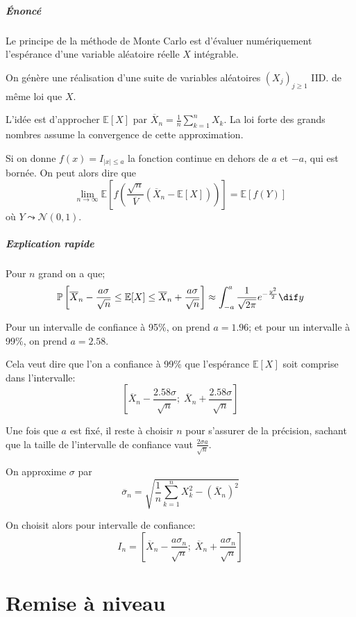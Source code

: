 \documentclass[a4paper,10pt,french,openany]{memoir}
\newcommand{\Proba}{\mathbb{P}}
\newcommand{\Esper}{\mathbb{E}}
\newcommand{\normale}{\mathcal{N}}
\newcommand{\abs}[1]{\lvert #1 \rvert}
\begin{document}
\paragraph{Énoncé}
Le principe de la méthode de Monte Carlo est d'évaluer numériquement l'espérance d'une variable aléatoire réelle $X$ intégrable.

On génère une réalisation d'une suite de variables aléatoires $(X_j)_{j\geq1}$ IID. de même loi que $X$.

L'idée est d'approcher $\Esper[X]$ par $\overline X_n = \frac1n \sum_{k=1}^n X_k$. La loi forte des grands nombres assume la convergence de cette approximation.

Si on donne $f(x)=I_{\abs x \leq a}$ la fonction continue en dehors de $a$ et $-a$, qui est bornée. On peut alors dire que \[\lim_{n\to\infty} \Esper\left[f\left(\frac{\sqrt n}{\overline V} (\overline X_n - \Esper[X])\right)\right] = \Esper[f(Y)]\]
où $Y\leadsto\normale(0,1)$.

\paragraph{Explication rapide}
Pour $n$ grand on a que; \[\Proba\left[\overline X_n - \frac{a\sigma}{\sqrt n} \leq \Esper[X] \leq \overline X_n + \frac{a\sigma}{\sqrt n}\right] \approx \int_{-a}^a \frac1{\sqrt{2\pi}} e^{-\frac{y^2}2} \dif y\]

Pour un intervalle de confiance à 95\%, on prend $a=1.96$; et pour un intervalle à 99\%, on prend $a=2.58$.

Cela veut dire que l'on a confiance à 99\% que l'espérance $\Esper[X]$ soit comprise dans l'intervalle: \[\left[ \overline X_n - \frac{2.58\sigma}{\sqrt n};\; \overline X_n + \frac{2.58\sigma}{\sqrt n} \right]\]

Une fois que $a$ est fixé, il reste à choisir $n$ pour s'assurer de la précision, sachant que la taille de l'intervalle de confiance vaut $\frac{2\sigma a}{\sqrt n}$.

On approxime $\sigma$ par \[\overline\sigma_n = \sqrt{\frac1n \sum_{k=1}^n X_k^2 - (\overline X_n)^2}\]

On choisit alors pour intervalle de confiance:
\[I_n = \left[ \overline X_n - \frac{a\sigma_n}{\sqrt n};\; \overline X_n + \frac{a\sigma_n}{\sqrt n} \right]\]

\chapter{Remise à niveau}
\end{document}
